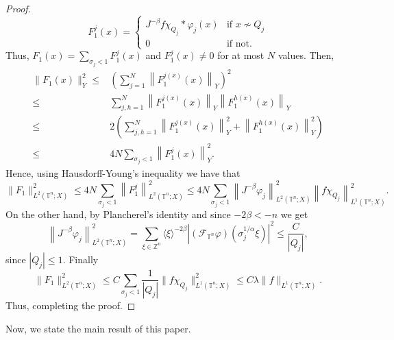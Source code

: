 \documentclass[12pt, reqno]{amsart}
\theoremstyle{definition}
\theoremstyle{remark}
\numberwithin{equation}{section}
\begin{document}
\begin{proof}
    \begin{equation*}
        F_1^j(x) = \begin{cases}
            J^{-\beta} f\chi_{Q_j}*\varphi_j(x) & \text{if }x \nsim Q_j \\ 0 & \text{if not}.
        \end{cases}
    \end{equation*}
    Thus, $F_1(x)=\sum_{\sigma_j <1} F_1^j(x)$ and $F_1^j(x) \neq 0$ for at most $N$ values. Then,
    \begin{align*}
        \|F_1(x)\|_Y^2 \leq & \left( \sum_{j=1}^N\left\|F_1^{j(x)}(x)\right\|_Y \right)^2 \\
        \leq & \sum_{j,h=1}^N\left\|F_1^{j(x)}(x)\right\|_Y \left\|F_1^{h(x)}(x)\right\|_Y \\
        \leq & 2\left( \sum_{j,h=1}^N \left\|F_1^{j(x)}(x)\right\|_Y^2 + \left\|F_1^{h(x)}(x)\right\|_Y^2 \right) \\
        \leq & 4N\sum_{\sigma_j < 1}\left\|F_1^j(x)\right\|_Y^2.
    \end{align*}
    Hence, using Hausdorff-Young's inequality we have that
    \begin{equation*}
        \|F_1\|_{L^2(\mathbb{T}^n; X)}^2 \leq 4N\sum_{\sigma_j<1} \left\| F_1^j \right\|_{L^2(\mathbb{T}^n; X)}^2 \leq 4N\sum_{\sigma_j<1} \left\| J^{-\beta} \varphi_j \right\|_{L^2(\mathbb{T}^n; X)}^2\left\| f\chi_{Q_j} \right\|_{L^1(\mathbb{T}^n; X)}^2.
    \end{equation*}
    On the other hand, by Plancherel's identity and since $-2\beta < -n$ we get
    \begin{equation*}
        \left\| J^{-\beta} \varphi_j \right\|_{L^2(\mathbb{T}^n; X)}^2 = \sum_{\xi \in \mathbb{Z}^n } \langle\xi\rangle^{-2\beta} \left|(\mathcal{F}_{\mathbb{T}^n} \varphi)\left(\sigma_j^{1/\alpha}\xi\right)\right|^2 \leq     \frac{C}{|Q_j|},
    \end{equation*}
    since $|Q_j| \leq 1$. Finally
    \begin{equation*}
        \|F_1\|_{L^2(\mathbb{T}^n; X)}^2 \leq C\sum_{\sigma_j<1}\frac{1}{|Q_j|} \|f\chi_{Q_j}\|_{L^1(\mathbb{T}^n; X)}^2 \leq C\lambda \|f\|_{L^1(\mathbb{T}^n; X)}.
    \end{equation*}
    Thus, completing the proof.
\end{proof}

Now, we state the main result of this paper.
\end{document}
